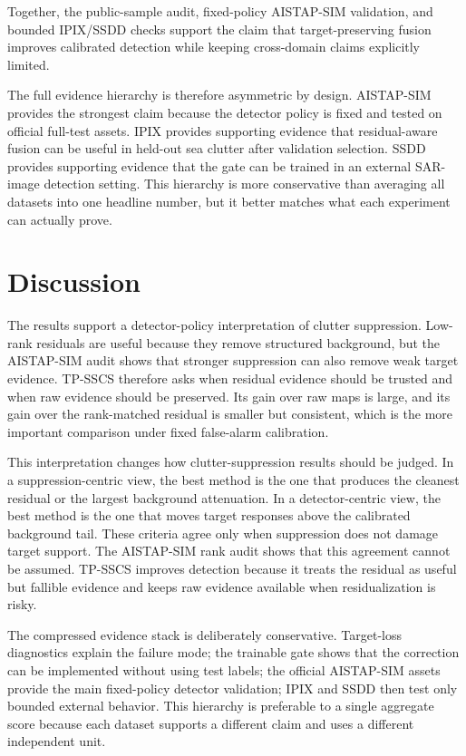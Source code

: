 \documentclass[journal]{IEEEtran}
\begin{document}
Together, the public-sample audit, fixed-policy AISTAP-SIM validation, and bounded IPIX/SSDD checks support the claim that target-preserving fusion improves calibrated detection while keeping cross-domain claims explicitly limited.

The full evidence hierarchy is therefore asymmetric by design. AISTAP-SIM provides the strongest claim because the detector policy is fixed and tested on official full-test assets. IPIX provides supporting evidence that residual-aware fusion can be useful in held-out sea clutter after validation selection. SSDD provides supporting evidence that the gate can be trained in an external SAR-image detection setting. This hierarchy is more conservative than averaging all datasets into one headline number, but it better matches what each experiment can actually prove.

\section{Discussion}

The results support a detector-policy interpretation of clutter suppression. Low-rank residuals are useful because they remove structured background, but the AISTAP-SIM audit shows that stronger suppression can also remove weak target evidence. TP-SSCS therefore asks when residual evidence should be trusted and when raw evidence should be preserved. Its gain over raw maps is large, and its gain over the rank-matched residual is smaller but consistent, which is the more important comparison under fixed false-alarm calibration.

This interpretation changes how clutter-suppression results should be judged. In a suppression-centric view, the best method is the one that produces the cleanest residual or the largest background attenuation. In a detector-centric view, the best method is the one that moves target responses above the calibrated background tail. These criteria agree only when suppression does not damage target support. The AISTAP-SIM rank audit shows that this agreement cannot be assumed. TP-SSCS improves detection because it treats the residual as useful but fallible evidence and keeps raw evidence available when residualization is risky.

The compressed evidence stack is deliberately conservative. Target-loss diagnostics explain the failure mode; the trainable gate shows that the correction can be implemented without using test labels; the official AISTAP-SIM assets provide the main fixed-policy detector validation; IPIX and SSDD then test only bounded external behavior. This hierarchy is preferable to a single aggregate score because each dataset supports a different claim and uses a different independent unit.
\end{document}
